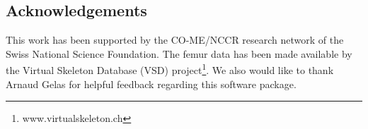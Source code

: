 \documentclass{InsightArticle}
\begin{document}
\subsection*{Acknowledgements}
This work has been supported by the CO-ME/NCCR research network of
the Swiss National Science Foundation. The femur data has been made available by the Virtual Skeleton Database (VSD) project\footnote{www.virtualskeleton.ch}. We also would like to thank Arnaud Gelas for helpful feedback regarding 
this software package. 


%
%



\end{document}
